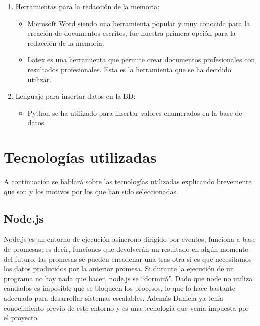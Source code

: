 \documentclass[11pt]{article}
\begin{document}
\begin{enumerate}
\begin{itemize}
	\end{itemize}
	\item Herramientas para la redacción de la memoria:
	\begin{itemize} 
		\item Microsoft Word siendo una herramienta popular y muy conocida para la creación de documentos escritos, fue nuestra primera opción para la redacción de la memoria.
		\item Latex es una herramienta que permite crear documentos profesionales con resultados profesionales. Esta es la herramienta que se ha decidido utilizar.
	\end{itemize}
	\item Lenguaje para insertar datos en la BD:
	\begin{itemize} 
		\item Python se ha utilizado para insertar valores enumerados en la base de datos.
	\end{itemize}
\end{enumerate}

\section{Tecnologías utilizadas}
A continuación se hablará sobre las tecnologías utilizadas explicando brevemente que son y los motivos por los que han sido seleccionadas.

	\subsection{Node.js} 
Node.js es un entorno de ejecución asíncrono dirigido por eventos, funciona a base de promesas, es decir, funciones que devolverán un resultado en algún momento del futuro, las promesas se pueden encadenar una tras otra si es que necesitamos los datos producidos por la anterior promesa. Si durante la ejecución de un programa no hay nada que hacer, node.js se “dormirá”. 
	Dado que node no utiliza candados es imposible que se bloqueen los procesos, lo que lo hace bastante adecuado para desarrollar sistemas escalables. Además Daniela ya tenía conocimiento previo de este entorno y es una tecnología que venía impuesta por el proyecto.
\end{document}

